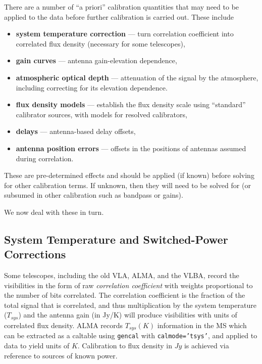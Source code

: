 There are a number of ``a priori'' calibration quantities that
may need to be applied to the data before further calibration
is carried out.  These include
\begin{itemize}
   \item {\bf system temperature correction} --- turn correlation
      coefficient into correlated flux density (necessary for some
      telescopes),
   \item {\bf gain curves} --- antenna gain-elevation dependence,
   \item {\bf atmospheric optical depth} --- attenuation of the signal
      by the atmosphere, including correcting for its elevation dependence.
   \item {\bf flux density models} --- establish the flux density
      scale using ``standard'' calibrator sources, with models for
      resolved calibrators,
   \item {\bf delays} --- antenna-based delay offsets,
   \item {\bf antenna position errors} --- offsets in the positions of
      antennas assumed during correlation.
\end{itemize}
These are pre-determined effects and should be applied (if known) before
solving for other calibration terms.  If unknown, then they will
need to be solved for (or subsumed in other calibration such as 
bandpass or gains).

We now deal with these in turn.

\subsection{System Temperature and Switched-Power Corrections}
\label{section:cal.prior.tsys}

Some telescopes, including the old VLA, ALMA, and the VLBA, record the
visibilities in the form of raw {\it correlation coefficient} with
weights proportional to the number of bits correlated.  The
correlation coefficient is the fraction of the total signal that is
correlated, and thus multiplication by the system temperature
($T_{sys}$) and the antenna gain (in Jy/K) will produce visibilities 
with units of correlated flux density.  ALMA records $T_{sys}(K)$ 
information in the MS which can be extracted as a caltable using 
{\tt gencal} with {\tt calmode='tsys'}, and applied to data to yield
units of $K$.  Calibration to flux density in $Jy$ is achieved
via reference to sources of known power.

